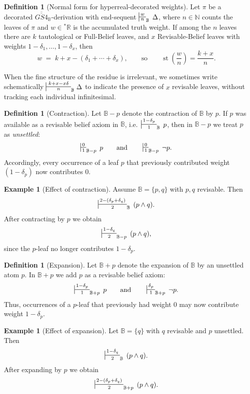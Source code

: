 \documentclass[12pt,a4paper,reqno]{amsart}
\theoremstyle{definition}
\newtheorem{definition}[theorem]{Definition}
\newtheorem{example}[theorem]{Example}
\newcommand{\numberset}{\mathbb}
\newcommand{\N}{\numberset{N}}
\newcommand{\R}{\numberset{R}}
\newcommand{\B}{\numberset{B}}
\DeclareMathOperator{\st}{st}
\newcommand{\Rstar}{{}^{\ast}\R}
\begin{document}
\begin{definition}[Normal form for hyperreal-decorated weights]\label{def:hyperreal-normal-form}
Let $\pi$ be a decorated $\overline{\overline{GS4}}_\B$-derivation with end-sequent $\sststile{n}{w}_\B\, \Delta$, where $n\in\N$ counts the leaves of $\pi$ and $w\in\Rstar$ is the accumulated truth weight.  If among the $n$ leaves there are $k$ tautological or Full-Belief leaves, and $x$ Revisable-Belief leaves with weights $1-\delta_1,\dots,1-\delta_x$, then
\[
w \;=\; k+x - (\delta_1+\cdots+\delta_x),
\qquad\text{so}\qquad
\st\!\left(\frac{w}{n}\right)=\frac{k+x}{n}.
\]
\end{definition}

\noindent
When the fine structure of the residue is irrelevant, we sometimes write schematically $\sststile{n}{\,k+x-x\delta\,}_\B \Delta$ to indicate the presence of $x$ revisable leaves, without tracking each individual infinitesimal.


\begin{definition}[Contraction]\label{def:contraction}
Let $\B-p$ denote the contraction of $\B$ by $p$.  If $p$ was available as a revisable belief axiom in $\B$, i.e.\ $\sststile{1}{1-\delta_p}_\B\, p$, then in $\B-p$ we treat $p$ as \emph{unsettled}:
\[
\sststile{1}{0}_{\B-p}\, p
\qquad\text{and}\qquad
\sststile{1}{0}_{\B-p}\, \neg p.
\]
Accordingly, every occurrence of a leaf $p$ that previously contributed weight $(1-\delta_p)$ now contributes $0$.
\end{definition}

\begin{example}[Effect of contraction]
Assume $\B=\{p,q\}$ with $p,q$ revisable.  Then
\[
\sststile{2}{2-(\delta_p+\delta_q)}_\B\, (p\wedge q).
\]
After contracting by $p$ we obtain
\[
\sststile{2}{1-\delta_q}_{\B-p}\, (p\wedge q),
\]
since the $p$-leaf no longer contributes $1-\delta_p$.
\end{example}

\begin{definition}[Expansion]\label{def:expansion}
Let $\B+p$ denote the expansion of $\B$ by an unsettled atom $p$.  In $\B+p$ we add $p$ as a revisable belief axiom:
\[
\sststile{1}{1-\delta_p}_{\B+p}\, p
\qquad\text{and}\qquad
\sststile{1}{\delta_p}_{\B+p}\, \neg p.
\]
Thus, occurrences of a $p$-leaf that previously had weight $0$ may now contribute weight $1-\delta_p$.
\end{definition}

\begin{example}[Effect of expansion]
Let $\B=\{q\}$ with $q$ revisable and $p$ unsettled.  Then
\[
\sststile{2}{1-\delta_q}_\B\, (p\wedge q).
\]
After expanding by $p$ we obtain
\[
\sststile{2}{2-(\delta_p+\delta_q)}_{\B+p}\, (p\wedge q).
\]
\end{example}
\end{document}

